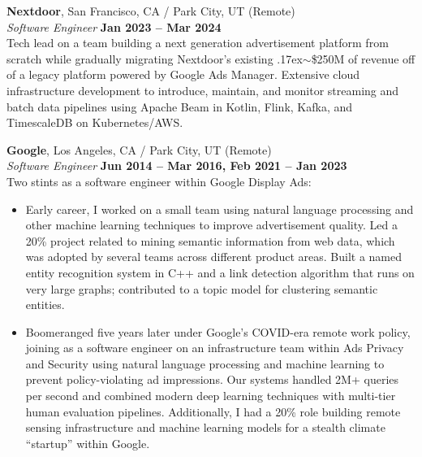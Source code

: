 \documentclass[margin,line]{resume}
\begin{document}
\begin{resume}
    \textbf{Nextdoor}, San Francisco, CA / Park City, UT (Remote)  \vspace{2mm}\\\vspace{1mm}%
    \textsl{Software Engineer} \hfill \textbf{Jan 2023 -- Mar 2024}\\
    Tech lead on a team building a next generation advertisement platform from
    scratch while gradually migrating Nextdoor's existing
    {\raise.17ex\hbox{$\scriptstyle\sim$}}\$250M of revenue off of a legacy
    platform powered by Google Ads Manager. Extensive cloud infrastructure
    development to introduce, maintain, and monitor streaming and batch data
    pipelines using Apache Beam in Kotlin, Flink, Kafka, and TimescaleDB on
    Kubernetes/AWS.

    \textbf{Google}, Los Angeles, CA / Park City, UT (Remote)  \vspace{2mm}\\\vspace{1mm}%
    \textsl{Software Engineer} \hfill \textbf{Jun 2014 -- Mar 2016, Feb 2021 -- Jan 2023}\\
    Two stints as a software engineer within Google Display Ads:

    \begin{itemize}
    \item Early career, I worked on a small team using natural language
      processing and other machine learning techniques to improve advertisement
      quality. Led a 20\% project related to mining semantic information from
      web data, which was adopted by several teams across different product
      areas. Built a named entity recognition system in C++ and a link detection
      algorithm that runs on very large graphs; contributed to a topic model for
      clustering semantic entities.

    \item Boomeranged five years later under Google's COVID-era remote work
      policy, joining as a software engineer on an infrastructure team within
      Ads Privacy and Security using natural language processing and machine
      learning to prevent policy-violating ad impressions. Our systems handled
      2M+ queries per second and combined modern deep learning techniques with
      multi-tier human evaluation pipelines. Additionally, I had a 20\% role
      building remote sensing infrastructure and machine learning models for a
      stealth climate ``startup'' within Google.

    \end{itemize}


\end{resume}
\end{document}
